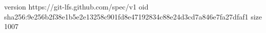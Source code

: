 version https://git-lfs.github.com/spec/v1
oid sha256:9e256b2f38e1b5e2e13258c901fd8e47192834c88e24d3cd7a846e7fa27dfaf1
size 1007
